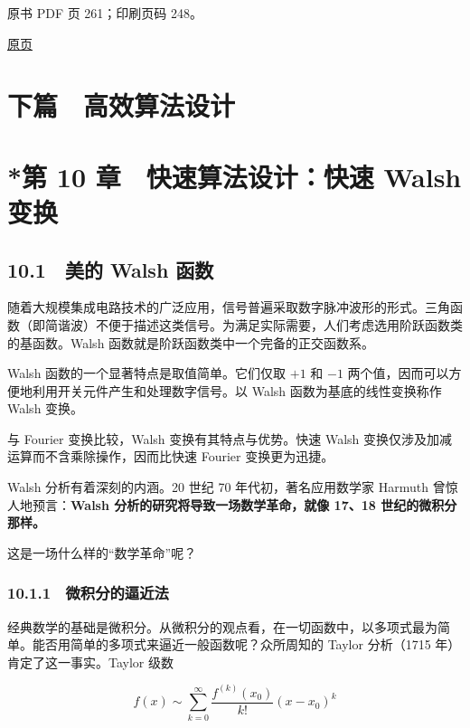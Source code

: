 \clearpage

原书 PDF 页 261；印刷页码 248。

\href{source-images/pdf-261.jpeg}{原页}

\section{下篇　高效算法设计}\label{ch10-ux4e0bux7bc7-ux9ad8ux6548ux7b97ux6cd5ux8bbeux8ba1}

\section{*第 10 章　快速算法设计：快速 Walsh 变换}\label{ch10-ux7b2c-10-ux7ae0-ux5febux901fux7b97ux6cd5ux8bbeux8ba1ux5febux901f-walsh-ux53d8ux6362}

\subsection{10.1　美的 Walsh 函数}\label{ch10-ux7f8eux7684-walsh-ux51fdux6570}

随着大规模集成电路技术的广泛应用，信号普遍采取数字脉冲波形的形式。三角函数（即简谐波）不便于描述这类信号。为满足实际需要，人们考虑选用阶跃函数类的基函数。Walsh 函数就是阶跃函数类中一个完备的正交函数系。

Walsh 函数的一个显著特点是取值简单。它们仅取 \(+1\) 和 \(-1\) 两个值，因而可以方便地利用开关元件产生和处理数字信号。以 Walsh 函数为基底的线性变换称作 Walsh 变换。

与 Fourier 变换比较，Walsh 变换有其特点与优势。快速 Walsh 变换仅涉及加减运算而不含乘除操作，因而比快速 Fourier 变换更为迅捷。

Walsh 分析有着深刻的内涵。20 世纪 70 年代初，著名应用数学家 Harmuth 曾惊人地预言：\textbf{Walsh 分析的研究将导致一场数学革命，就像 17、18 世纪的微积分那样。}

这是一场什么样的``数学革命''呢？

\subsubsection{10.1.1　微积分的逼近法}\label{ch10-ux5faeux79efux5206ux7684ux903cux8fd1ux6cd5}

经典数学的基础是微积分。从微积分的观点看，在一切函数中，以多项式最为简单。能否用简单的多项式来逼近一般函数呢？众所周知的 Taylor 分析（1715 年）肯定了这一事实。Taylor 级数

\[
f(x)\sim\sum_{k=0}^{\infty}\frac{f^{(k)}(x_0)}{k!}(x-x_0)^k
\]

